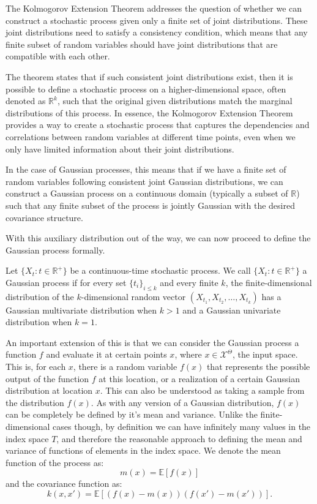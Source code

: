 The Kolmogorov Extension Theorem addresses the question of whether we can construct a stochastic process given only a finite set of joint distributions. These joint distributions need to satisfy a consistency condition, which means that any finite subset of random variables should have joint distributions that are compatible with each other.

The theorem states that if such consistent joint distributions exist, then it is possible to define a stochastic process on a higher-dimensional space, often denoted as $\mathbb{R}^k$, such that the original given distributions match the marginal distributions of this process. In essence, the Kolmogorov Extension Theorem provides a way to create a stochastic process that captures the dependencies and correlations between random variables at different time points, even when we only have limited information about their joint distributions. 

In the case of Gaussian processes, this means that if we have a finite set of random variables following consistent joint Gaussian distributions, we can construct a Gaussian process on a continuous domain (typically a subset of $\mathbb{R}$) such that any finite subset of the process is jointly Gaussian with the desired covariance structure. 

With this auxiliary distribution out of the way, we can now proceed to define the Gaussian process formally. 

\begin{definition}
	Let $\{ X_t: t \in \mathbb{R}^+ \}$ be a continuous-time stochastic process. We call $\{ X_t: t \in \mathbb{R}^+ \}$ a Gaussian process if for every set $\{ t_i \}_{i \leq k}$ and every finite $k$, the finite-dimensional distribution of the $k$-dimensional random vector $(X_{t_1}, X_{t_2}, \ldots, X_{t_k})$ has a Gaussian multivariate distribution when $k>1$ and a Gaussian univariate distribution when $k=1$. 
\end{definition} 



An important extension of this is that we can consider the Gaussian process a function $f$ and evaluate it at certain points $x$, where $x \in \mathcal{X}^\Theta$, the input space. This is, for each $x$, there is a random variable $f(x)$ that represents the possible output of the function $f$ at this location, or a realization of a certain Gaussian distribution at location $x$. This can also be understood as taking a sample from the distribution $f(x)$. As with any version of a Gaussian distribution, $f(x)$ can be completely be defined by it's mean and variance. Unlike the finite-dimensional cases though, by definition we can have infinitely many values in the index space $T$, and therefore the reasonable approach to defining the mean and variance of functions of elements in the index space. We denote the mean function of the process as: 
\[ m(x) = \mathbb{E}[f(x)] \]
and the covariance function as: 
\[ k(x, x') = \mathbb{E}[(f(x) - m(x))(f(x') - m(x'))]. \]

